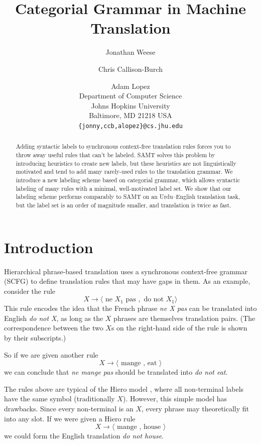 \documentclass{article}
\author{Jonathan Weese \and Chris Callison-Burch \and Adam Lopez\\Department of Computer Science\\Johns Hopkins University\\Baltimore, MD 21218 USA\\{\tt \{jonny,ccb,alopez\}@cs.jhu.edu}}
\title{Categorial Grammar in Machine Translation}
\begin{document}
\maketitle

\begin{abstract}
Adding syntactic labels to synchronous context-free translation rules forces you to throw away useful rules that can't be labeled. SAMT \cite{samt-wmt06} solves this problem by introducing heuristics to create new labels, but these heuristics are not linguistically motivated and tend to add many rarely-used rules to the translation grammar. We introduce a new labeling scheme based on categorial grammar, which allows syntactic labeling of many rules with a minimal, well-motivated label set. We show that our labeling scheme performs comparably to SAMT on an Urdu--English translation task, but the label set is an order of magnitude smaller, and translation is twice as fast.
\end{abstract}

\section{Introduction}

Hierarchical phrase-based translation uses a synchronous context-free grammar (SCFG) to define translation rules that may have gaps in them.
As an example, consider the rule
\begin{equation}
X \to \langle \textrm{ ne } X_1 \textrm{ pas }, \textrm{ do not } X_1 \rangle \label{rule:ne_pas}
\end{equation}
This rule encodes the idea that the French phrase {\em ne X pas} can be translated into English {\em do not X}, as long as the $X$ phrases are themselves translation pairs. (The correspondence between the two $X$s on the right-hand side of the rule is shown by their subscripts.)

So if we are given another rule
\begin{equation}
X \to \langle \textrm{ mange , eat } \rangle
\end{equation}
we can conclude that {\em ne mange pas} should be translated into {\em do not eat}.

The rules above are typical of the Hiero model \cite{chiang2005}, where all non-terminal labels have the same symbol (traditionally $X$). However, this simple model has drawbacks. Since every non-terminal is an $X$, every phrase may theoretically fit into any slot. If we were given a Hiero rule
\begin{equation}
X \to \langle \textrm{ mange , house } \rangle
\end{equation}
we could form the English translation {\em do not house}. 
\end{document}

